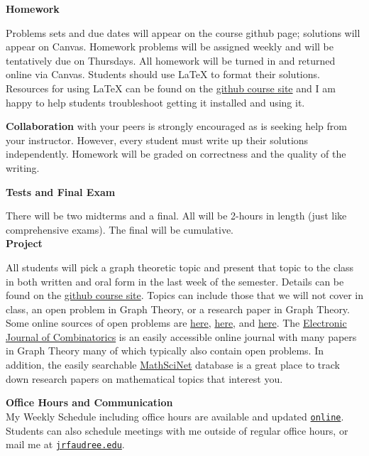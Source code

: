\documentclass[12pt]{article}
\renewcommand{\emph}[1]{\textsf{\textbf{#1}}}
\newcommand{\localhead}[1]{\par\smallskip\textbf{#1}\nobreak\\}%
\def\heading#1{\localhead{\large\emph{#1}}}
\begin{document}
{\textbf{\large{Homework}}}

Problems sets and due dates will appear on the course github page; solutions will appear on Canvas. Homework problems will be assigned weekly and will be tentatively due on Thursdays. All homework will be turned in and returned online via Canvas. Students should use  \LaTeX \: to format their solutions.  Resources for using \LaTeX \: can be found on the  \href{https://jrfaudree.github.io/M663f23/}{github course site} and I am happy to help students troubleshoot getting it installed and using it.

 \textbf{Collaboration} with your peers is strongly encouraged as is seeking help from your instructor. However, every student must write up their solutions independently. Homework will be graded on correctness and the quality of the writing.



{\textbf{\large{Tests and Final Exam}}}

There will be two midterms and a final. All will be 2-hours in length (just like comprehensive exams). The final will be cumulative.\\

{\textbf{\large{Project}}}

All students will pick a graph theoretic topic and present that topic to the class in both written and oral form in the last week of the semester. Details can be found on the \href{https://jrfaudree.github.io/M663f23/}{github course site}. Topics can include those that we will not cover in class, an open problem in Graph Theory, or a research paper in Graph Theory.  Some online sources of open problems are \href{http://www.openproblemgarden.org/category/graph_theory}{here}, \href{https://faculty.math.illinois.edu/~west/openp/}{here}, and \href{http://dimacs.rutgers.edu/~hochberg/undopen/graphtheory/graphtheory.html}{here}. The \href{https://www.combinatorics.org/}{Electronic Journal of Combinatorics} is an easily accessible online journal with many papers in Graph Theory many of which typically also contain open problems. In addition, the easily searchable  \href{https://mathscinet.ams.org/mathscinet}{MathSciNet} database is a great place to track down research papers on mathematical topics that interest you.


\heading{Office Hours and Communication}
My Weekly Schedule including office hours are available and updated \href{https://docs.google.com/spreadsheets/d/e/2PACX-1vSPkx0I1WQikJjmR8qs8wpf2oWcwO8CFS2VwCZYsdusMDkxTIQuOVwcV8LfAtsDtUGoj49xCS1mOIrW/pubhtml}{\texttt{online}}.  Students can also schedule meetings with me outside of regular office hours, or mail me at \href{mailto:jrfaudree@alaska.edu}{\texttt{jrfaudree\@@alaska.edu}}.
\end{document}
